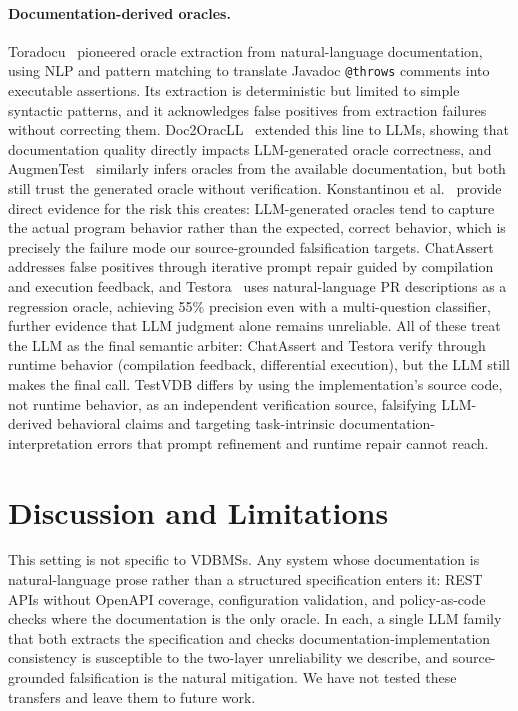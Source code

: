 \documentclass[sigconf]{acmart}
\begin{document}
\paragraph{Documentation-derived oracles.} Toradocu~\cite{toradocu16} pioneered oracle extraction from natural-language documentation, using NLP and pattern matching to translate Javadoc \texttt{@throws} comments into executable assertions. Its extraction is deterministic but limited to simple syntactic patterns, and it acknowledges false positives from extraction failures without correcting them. Doc2OracLL~\cite{doc2oracll25} extended this line to LLMs, showing that documentation quality directly impacts LLM-generated oracle correctness, and AugmenTest~\cite{augmentest25} similarly infers oracles from the available documentation, but both still trust the generated oracle without verification. Konstantinou et al.~\cite{konstantinou24} provide direct evidence for the risk this creates: LLM-generated oracles tend to capture the actual program behavior rather than the expected, correct behavior, which is precisely the failure mode our source-grounded falsification targets. ChatAssert~\cite{chatassert24} addresses false positives through iterative prompt repair guided by compilation and execution feedback, and Testora~\cite{testora26} uses natural-language PR descriptions as a regression oracle, achieving 55\% precision even with a multi-question classifier, further evidence that LLM judgment alone remains unreliable. All of these treat the LLM as the final semantic arbiter: ChatAssert and Testora verify through runtime behavior (compilation feedback, differential execution), but the LLM still makes the final call. TestVDB differs by using the implementation's source code, not runtime behavior, as an independent verification source, falsifying LLM-derived behavioral claims and targeting task-intrinsic documentation-interpretation errors that prompt refinement and runtime repair cannot reach.

\section{Discussion and Limitations} \label{sec:disc}

This setting is not specific to VDBMSs. Any system whose documentation is natural-language prose rather than a structured specification enters it: REST APIs without OpenAPI coverage, configuration validation, and policy-as-code checks where the documentation is the only oracle. In each, a single LLM family that both extracts the specification and checks documentation-implementation consistency is susceptible to the two-layer unreliability we describe, and source-grounded falsification is the natural mitigation. We have not tested these transfers and leave them to future work.
\end{document}
